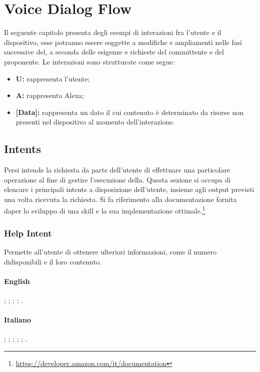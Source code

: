 \chapter{Voice Dialog Flow}

Il seguente capitolo presenta degli esempi di interazioni fra l'utente e il dispositivo, esse potranno essere soggette a modifiche e ampliamenti nelle fasi successive del, a seconda delle esigenze e richieste del committente e del proponente.
Le interazioni sono strutturate come segue:
\begin{itemize}
	\item \textbf{U:} rappresenta l'utente;
	\item \textbf{A:} rappresenta Alexa;
	\item \textbf{[Data]:} rappresenta un dato il cui contenuto è determinato da risorse non presenti nel dispositivo al momento dell'interazione.
\end{itemize}


\section{Intents}
Persi intende la richiesta da parte dell'utente di effettuare una particolare operazione al fine di gestire l'esecuzione della. 
Questa sezione si occupa di elencare i principali intents a disposizione dell'utente, insieme agli output previsti una volta ricevuta la richiesta.
Si fa riferimento alla documentazione fornita daper lo sviluppo di una skill e la sua implementazione ottimale.\footnote{\url{https://developer.amazon.com/it/documentation}}


\subsection{Help Intent}\label{help}
Permette all'utente di ottenere ulteriori informazioni, come il numero didisponibili e il loro contenuto.
\subsubsection{English}
\begin{itemize}
	;
	;
	;
	;
	.	
\end{itemize}
\subsubsection{Italiano}
\begin{itemize}
	;
	;
	;
	;
	;
	.
\end{itemize}


